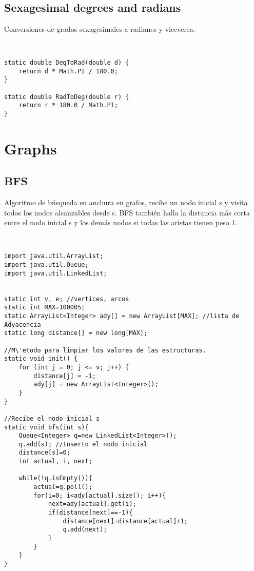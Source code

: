 \documentclass[11pt,letterpaper,twocolumn,twosided]{article}
\begin{document}
\subsection{Sexagesimal degrees and radians}
Conversiones de grados sexagesimales a radianes y viceversa.
\begin{lstlisting}


static double DegToRad(double d) { 
	return d * Math.PI / 180.0; 
}

static double RadToDeg(double r) { 
	return r * 180.0 / Math.PI;
}
\end{lstlisting}

\section{Graphs}

\subsection{BFS}
Algoritmo de b\'usqueda en anchura en grafos, recibe un nodo inicial s y visita todos los nodos alcanzables desde s. BFS tambi\'en halla la distancia m\'as corta entre el nodo inicial s y los dem\'as nodos si todas las aristas tienen peso 1.
\begin{lstlisting}


import java.util.ArrayList;
import java.util.Queue;
import java.util.LinkedList;


static int v, e; //vertices, arcos
static int MAX=100005; 
static ArrayList<Integer> ady[] = new ArrayList[MAX]; //lista de Adyacencia
static long distance[] = new long[MAX];

//M\'etodo para limpiar los valores de las estructuras.
static void init() {
    for (int j = 0; j <= v; j++) {
        distance[j] = -1;
        ady[j] = new ArrayList<Integer>();
    }
}

//Recibe el nodo inicial s
static void bfs(int s){
    Queue<Integer> q=new LinkedList<Integer>();
    q.add(s); //Inserto el nodo inicial
    distance[s]=0;
    int actual, i, next;
        
    while(!q.isEmpty()){
        actual=q.poll();
        for(i=0; i<ady[actual].size(); i++){
            next=ady[actual].get(i);
            if(distance[next]==-1){
                distance[next]=distance[actual]+1;
                q.add(next);
            }
        }
    }
}\end{lstlisting}
\end{document}
